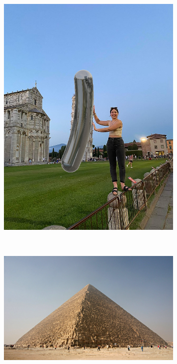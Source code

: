 \documentclass[%
reprint,
twocolumn,
nofootinbib,
 amsmath,amssymb,
 aps,
]{revtex4-2}
\begin{document}
\begin{figure}[H]
\begin{subfigure}{0.23\textwidth}
        \includegraphics[width=0.98\linewidth]{img/pisa-tourist-bean.png}
    \end{subfigure}
    \\
    \begin{subfigure}{0.23\textwidth}
        \includegraphics[width=0.98\linewidth]{img/Kheops-Pyramid.jpg}

\end{subfigure}
\end{figure}
\end{document}
